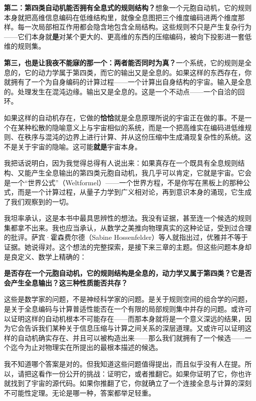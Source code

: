 \documentclass[11pt, twoside, openright]{book}
\begin{document}
\textbf{第二：第四类自动机能否拥有全息式的规则结构？}想象一个元胞自动机，它的规则本身就把高维信息编码在低维结构里，就像全息图把三个维度编码进两个维度那样。每一次局部相互作用都会隐含地包含全局结构。这些规则不只是产生复杂行为------它们本身就\textbf{是}对某个更大的、更高维的东西的压缩编码，被向下投影进一套低维的规则集。

\textbf{第三，也是让我夜不能寐的那一个：两者能否同时为真？}一个系统，它的规则是全息的，它的动力学属于第四类，而它的输出又是全息的。如果这样的东西存在，你就拥有了一个为自身编码的计算过程------一个计算出自身结构的宇宙。输入是全息的。处理发生在混沌边缘。输出又是全息的。这是一个不动点------一个自洽的回环。

如果这样的自动机存在，它做的\textbf{恰恰}就是全息原理所说的宇宙正在做的事。不是一个在某种松散的隐喻意义上与宇宙相似的系统，而是一个把高维实在编码进低维规则、在秩序与混沌的边界上进行计算、并从这份压缩中生成涌现复杂性的系统。这不是关于宇宙的隐喻。这可能\textbf{就是}宇宙本身。

我把话说明白，因为我觉得总得有人说出来：如果真存在一个既具有全息规则结构、又能产生全息输出的第四类元胞自动机，我几乎可以肯定，它就是宇宙。它会是一个“世界公式”（Weltformel）------一个世界方程，不是你写在黑板上的那种公式，而是一个计算过程，从量子力学到广义相对论，再到意识本身的涌现，它生成了我们观察到的一切。

我坦率承认，这是本书中最具思辨性的想法。我没有证据，甚至连一个候选的规则集都拿不出来。我也应当承认，从数学之美推向物理真实的这种论证，受到过合理的批评。萨宾·霍森费尔德（Sabine Hossenfelder）等人就指出过，优雅并不等于证据。她说得对。这个想法的完整探索，是接下来三章的主题。但这些问题本身却是良定义、数学上精确的：

\textbf{是否存在一个元胞自动机，它的规则结构是全息的，动力学又属于第四类？它是否会产生全息输出？这三种性质能否共存？}

这些是数学家的问题，不是神经科学家的问题。是关于规则空间的组合学的问题，是关于全息编码与计算普适性能否在一个有限的局部规则集中并存的问题。或许可以证明这样的自动机根本不可能存在------而那本身就将是一个意义深远的结果，因为它会告诉我们某种关于信息压缩与计算之间关系的深层道理。又或许可以证明这样的自动机确实存在、并且可以被构造出来------那么我们就拥有了一个候选------一个迄今为止对物理实在所提出的最根本描述的候选。

我不知道哪个答案是对的。但我知道这些问题值得提出，而且似乎没有人在提。所以，请把这看作一份公开的挑战：证明它，或者推翻它。如果你证明了它，你也许就找到了宇宙的源代码。如果你推翻了它，你就确立了一个连接全息与计算的深刻不可能性定理。无论是哪一种，答案都举足轻重。
\end{document}
